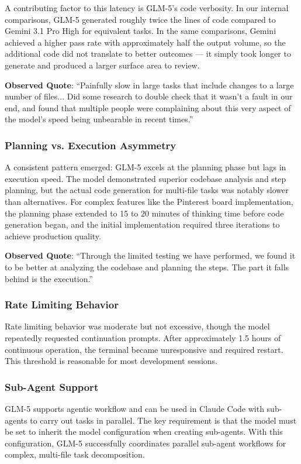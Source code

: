 \documentclass[conference]{IEEEtran}
\begin{document}
A contributing factor to this latency is GLM-5's code verbosity. In our internal comparisons, GLM-5 generated roughly twice the lines of code compared to Gemini 3.1 Pro High for equivalent tasks. In the same comparisons, Gemini achieved a higher pass rate with approximately half the output volume, so the additional code did not translate to better outcomes --- it simply took longer to generate and produced a larger surface area to review.

\textbf{Observed Quote}: ``Painfully slow in large tasks that include changes to a large number of files... Did some research to double check that it wasn't a fault in our end, and found that multiple people were complaining about this very aspect of the model's speed being unbearable in recent times.''

\subsubsection{Planning vs. Execution Asymmetry}
A consistent pattern emerged: GLM-5 excels at the planning phase but lags in execution speed. The model demonstrated superior codebase analysis and step planning, but the actual code generation for multi-file tasks was notably slower than alternatives. For complex features like the Pinterest board implementation, the planning phase extended to 15 to 20 minutes of thinking time before code generation began, and the initial implementation required three iterations to achieve production quality.

\textbf{Observed Quote}: ``Through the limited testing we have performed, we found it to be better at analyzing the codebase and planning the steps. The part it falls behind is the execution.''

\subsubsection{Rate Limiting Behavior}
Rate limiting behavior was moderate but not excessive, though the model repeatedly requested continuation prompts. After approximately 1.5 hours of continuous operation, the terminal became unresponsive and required restart. This threshold is reasonable for most development sessions.

\subsubsection{Sub-Agent Support}
GLM-5 supports agentic workflow and can be used in Claude Code with sub-agents to carry out tasks in parallel. The key requirement is that the model must be set to inherit the model configuration when creating sub-agents. With this configuration, GLM-5 successfully coordinates parallel sub-agent workflows for complex, multi-file task decomposition.
\end{document}
